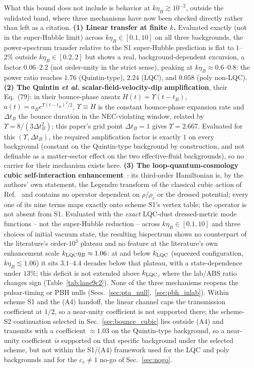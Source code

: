 \documentclass[aps,prd,twocolumn,superscriptaddress,nofootinbib,longbibliography]{revtex4-2}
\begin{document}
What this bound does not include is behavior at $k\eta_B\gtrsim10^{-2}$,
outside the validated band, where three mechanisms have now been checked
directly rather than left as a citation. \textbf{(1) Linear transfer at
finite $k$.} Evaluated exactly (not in the super-Hubble limit) across
$k\eta_B\in[0.1,10]$ on all three backgrounds, the power-spectrum transfer
relative to the S1 super-Hubble prediction is flat to $1$--$2\%$ outside
$k\eta_B\in[0.2,2]$ but shows a real, background-dependent excursion, a
factor $0.06$--$2.2$ (not order-unity in the strict sense), peaking at
$k\eta_B\approx0.6$--$0.8$: the power ratio
reaches $1.76$ (Quintin-type), $2.24$ (LQC), and $0.058$ (poly non-LQC).
\textbf{(2) The Quintin \textit{et al.} scalar-field-velocity-dip
amplification}, their Eq.~(79): in their bounce-phase ansatz
$H(t)=\Upsilon(t-t_B)$, $a(t)=a_Be^{\Upsilon(t-t_B)^2/2}$, $\Upsilon\equiv
\dot H$ is the constant bounce-phase expansion rate and $\Delta t_B$ the
bounce duration in the NEC-violating window, related by
$\Upsilon=8/(3\Delta t_B^2)$; this paper's grid point $\Delta t_B=1$
gives $\Upsilon=2.667$. Evaluated for this $(\Upsilon,\Delta t_B)$, the
required amplification factor is exactly $1$ on
every background (constant on the Quintin-type background by
construction, and not definable as a matter-sector effect on the two
effective-fluid backgrounds), so no carrier for their mechanism exists
here. \textbf{(3) The loop-quantum-cosmology cubic self-interaction
enhancement}~\cite{AgulloBolliet2017}: its third-order Hamiltonian is, by
the authors' own statement, the Legendre transform of the classical cubic
action of Ref.~\cite{Maldacena2002} and contains no operator dependent on
$\rho/\rho_c$ or the dressed potential; every one of its nine terms maps
exactly onto scheme S1's vertex table; the operator is not absent from S1.
Evaluated with the
\emph{exact} LQC-dust dressed-metric mode functions -- not the
super-Hubble reduction -- across $k\eta_B\in[0.1,10]$ and three choices of
initial vacuum state, the resulting bispectrum shows no counterpart of the
literature's order-$10^3$ plateau and no feature at the literature's own
enhancement scale $k_{\rm LQC}\eta_B\approx1.06$: at and below $k_{\rm LQC}$
(squeezed configuration, $k\eta_B\lesssim1.06$) it sits $3.1$--$4.4$
decades below that plateau, with a state-dependence under $13\%$; this
deficit is not extended above $k_{\rm LQC}$, where the lab/ABS ratio
changes sign (Table~\ref{tab:lane9c2}). None of
the three mechanisms reopens the pulsar-timing or PBH nulls
(Secs.~\ref{sec:pta_null},~\ref{sec:pbh_inlab}). Within scheme S1 and the
(A4) handoff, the linear channel caps the transmission coefficient at
$1/2$, so a near-unity coefficient is not supported there; the
scheme-S2 continuation selected in Sec.~\ref{sec:bounce_cubic} lies
outside (A4) and transmits with a coefficient $\approx1.03$ on the
Quintin-type background, so a near-unity coefficient \emph{is} supported
on that specific background under the selected scheme, but not within
the S1/(A4) framework used for the LQC and poly backgrounds and for the
$c_s\neq1$ no-go of Sec.~\ref{sec:nogo}.
\end{document}
